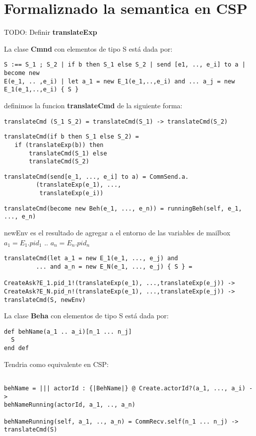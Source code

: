 \chapter{Formaliznado la semantica en CSP}

TODO: Definir \textbf{translateExp}

La clase \textbf{Cmnd} con elementos de tipo S está dada por:

\begin{verbatim}
S :== S_1 ; S_2 | if b then S_1 else S_2 | send [e1, .., e_i] to a | become new
E(e_1, .. ,e_i) | let a_1 = new E_1(e_1,..,e_i) and ... a_j = new
E_1(e_1,..,e_i) { S } 
\end{verbatim}

definimos la funcion \textbf{translateCmd} de la siguiente forma:

\begin{verbatim}
translateCmd (S_1 S_2) = translateCmd(S_1) -> translateCmd(S_2)
\end{verbatim}


\begin{verbatim}
translateCmd(if b then S_1 else S_2) = 
   if (translateExp(b)) then
       translateCmd(S_1) else 
       translateCmd(S_2)
\end{verbatim}

\begin{verbatim}
translateCmd(send[e_1, ..., e_i] to a) = CommSend.a.
         (translateExp(e_1), ..., 
          translateExp(e_i)) 
\end{verbatim}

\begin{verbatim}
translateCmd(become new Beh(e_1, ..., e_n)) = runningBeh(self, e_1, ..., e_n)
\end{verbatim}

newEnv es el resultado de agregar a el entorno de las variables de mailbox $a_1
= E_1.pid_1$ .. $a_n = E_n.pid_n$
\begin{verbatim}
translateCmd(let a_1 = new E_1(e_1, ..., e_j) and 
         ... and a_n = new E_N(e_1, ..., e_j) { S } = 

CreateAsk?E_1.pid_1!(translateExp(e_1), ...,translateExp(e_j)) ->
CreateAsk?E_N.pid_n!(translateExp(e_1), ...,translateExp(e_j)) ->
translateCmd(S, newEnv)
\end{verbatim}


La clase \textbf{Beha} con elementos de tipo S está dada por:

\begin{verbatim}
def behName(a_1 .. a_i)[n_1 ... n_j]
  S
end def
\end{verbatim}

Tendria como equivalente en CSP:

\begin{verbatim}

behName = ||| actorId : {|BehName|} @ Create.actorId?(a_1, ..., a_i) ->
behNameRunning(actorId, a_1, .., a_n)

behNameRunning(self, a_1, .., a_n) = CommRecv.self(n_1 ... n_j) -> translateCmd(S)

\end{verbatim}
